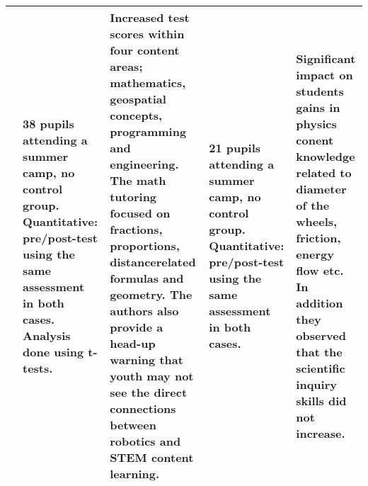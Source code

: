 \begin{longtable}{@{\extracolsep{\fill}}p{}p{}@{\hspace{10pt}}p{}}
	 & 38 pupils attending a summer camp, no control group. \textbf{Quantitative}: pre/post-test using the same assessment in both cases. Analysis done using t-tests. & Increased test scores within four content areas; mathematics, geospatial concepts, programming and engineering. The math tutoring focused on fractions, proportions, distancerelated formulas and geometry. The authors also provide a head-up warning that youth may not see the direct connections between robotics and STEM content learning.\hline
	
	 & 21 pupils attending a summer camp, no control group. \textbf{Quantitative}: pre/post-test using the same assessment in both cases.  & Significant impact on students gains in physics conent knowledge related to diameter of the wheels, friction, energy flow etc. In addition they observed that the scientific inquiry skills did not increase.  \\\hline
\end{longtable}
